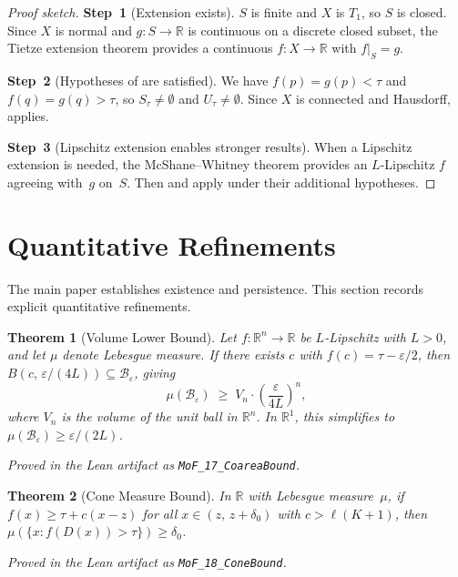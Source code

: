 \documentclass[11pt]{article}
\newtheorem{theorem}{Theorem}[section]
\newcommand{\R}{\mathbb{R}}
\begin{document}
\begin{proof}[Proof sketch]
\textbf{Step~1} (Extension exists).
$S$ is finite and $X$ is $T_1$, so $S$ is closed. Since $X$ is normal
and $g\colon S \to \R$ is continuous on a discrete closed subset, the
Tietze extension theorem provides a continuous
$f\colon X \to \R$ with $f|_S = g$.

\textbf{Step~2} (Hypotheses of  are satisfied).
We have $f(p) = g(p) < \tau$ and $f(q) = g(q) > \tau$, so
$S_\tau \neq \emptyset$ and $U_\tau \neq \emptyset$. Since $X$ is
connected and Hausdorff,  applies.

\textbf{Step~3} (Lipschitz extension enables stronger results).
When a Lipschitz extension is needed, the McShane--Whitney theorem
provides an $L$-Lipschitz $f$ agreeing with~$g$ on~$S$. Then
 and  apply under their
additional hypotheses.
\end{proof}

\section{Quantitative Refinements}
\label{app:quantitative}

The main paper establishes existence and persistence. This section
records explicit quantitative refinements.

\begin{theorem}[Volume Lower Bound]
\label{thm:coarea}
Let $f\colon \R^n \to \R$ be $L$-Lipschitz with $L > 0$, and let
$\mu$ denote Lebesgue measure. If there exists $c$ with
$f(c) = \tau - \varepsilon/2$, then
$B(c,\, \varepsilon/(4L)) \subseteq
\mathcal{B}_\varepsilon$, giving
\[
  \mu(\mathcal{B}_\varepsilon)
  \;\geq\; V_n \cdot \left(\frac{\varepsilon}{4L}\right)^{\!n},
\]
where $V_n$ is the volume of the unit ball in $\R^n$. In $\R^1$,
this simplifies to $\mu(\mathcal{B}_\varepsilon) \geq \varepsilon/(2L)$.
\end{theorem}

\noindent\emph{Proved in the Lean artifact as
\textup{\texttt{MoF\_17\_CoareaBound}}.}

\begin{theorem}[Cone Measure Bound]
\label{thm:cone}
In $\R$ with Lebesgue measure~$\mu$, if
$f(x) \geq \tau + c(x - z)$ for all $x \in (z,\, z + \delta_0)$
with $c > \ell(K+1)$, then
$\mu(\{x : f(D(x)) > \tau\}) \geq \delta_0$.
\end{theorem}

\noindent\emph{Proved in the Lean artifact as
\textup{\texttt{MoF\_18\_ConeBound}}.}
\end{document}
